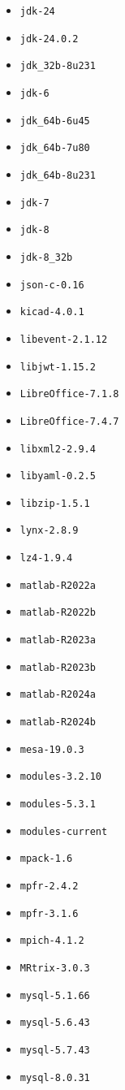 \begin{multicols}{3}
\begin{itemize}
\item \verb|jdk-24|
\item \verb|jdk-24.0.2|
\item \verb|jdk_32b-8u231|
\item \verb|jdk-6|
\item \verb|jdk_64b-6u45|
\item \verb|jdk_64b-7u80|
\item \verb|jdk_64b-8u231|
\item \verb|jdk-7|
\item \verb|jdk-8|
\item \verb|jdk-8_32b|
\item \verb|json-c-0.16|
\item \verb|kicad-4.0.1|
\item \verb|libevent-2.1.12|
\item \verb|libjwt-1.15.2|
\item \verb|LibreOffice-7.1.8|
\item \verb|LibreOffice-7.4.7|
\item \verb|libxml2-2.9.4|
\item \verb|libyaml-0.2.5|
\item \verb|libzip-1.5.1|
\item \verb|lynx-2.8.9|
\item \verb|lz4-1.9.4|
\item \verb|matlab-R2022a|
\item \verb|matlab-R2022b|
\item \verb|matlab-R2023a|
\item \verb|matlab-R2023b|
\item \verb|matlab-R2024a|
\item \verb|matlab-R2024b|
\item \verb|mesa-19.0.3|
\item \verb|modules-3.2.10|
\item \verb|modules-5.3.1|
\item \verb|modules-current|
\item \verb|mpack-1.6|
\item \verb|mpfr-2.4.2|
\item \verb|mpfr-3.1.6|
\item \verb|mpich-4.1.2|
\item \verb|MRtrix-3.0.3|
\item \verb|mysql-5.1.66|
\item \verb|mysql-5.6.43|
\item \verb|mysql-5.7.43|
\item \verb|mysql-8.0.31|

\end{itemize}
\end{multicols}
